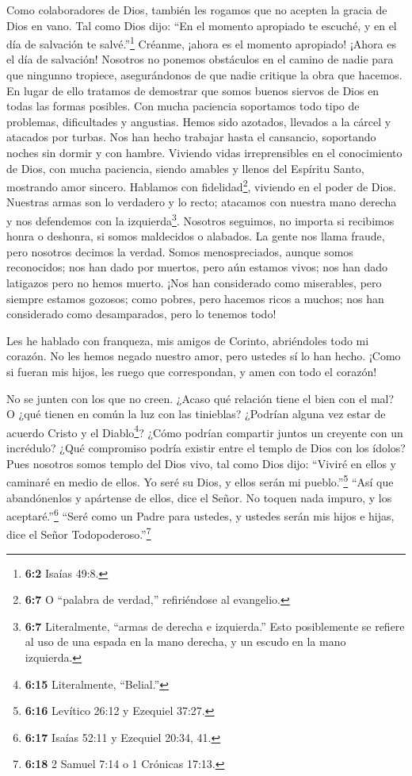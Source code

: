  Como colaboradores de Dios, también les rogamos que no
acepten la gracia de Dios en vano.  Tal como Dios dijo: ``En
el momento apropiado te escuché, y en el día de salvación te
salvé.''\footnote{\textbf{6:2} Isaías 49:8.} Créanme, ¡ahora es el
momento apropiado! ¡Ahora es el día de salvación!  Nosotros
no ponemos obstáculos en el camino de nadie para que ningunno tropiece,
asegurándonos de que nadie critique la obra que hacemos.  En
lugar de ello tratamos de demostrar que somos buenos siervos de Dios en
todas las formas posibles. Con mucha paciencia soportamos todo tipo de
problemas, dificultades y angustias.  Hemos sido azotados,
llevados a la cárcel y atacados por turbas. Nos han hecho trabajar hasta
el cansancio, soportando noches sin dormir y con hambre. 
Viviendo vidas irreprensibles en el conocimiento de Dios, con mucha
paciencia, siendo amables y llenos del Espíritu Santo, mostrando amor
sincero.  Hablamos con fidelidad\footnote{\textbf{6:7} O
  ``palabra de verdad,'' refiriéndose al evangelio.}, viviendo en el
poder de Dios. Nuestras armas son lo verdadero y lo recto; atacamos con
nuestra mano derecha y nos defendemos con la izquierda\footnote{\textbf{6:7}
  Literalmente, ``armas de derecha e izquierda.'' Esto posiblemente se
  refiere al uso de una espada en la mano derecha, y un escudo en la
  mano izquierda.}.  Nosotros seguimos, no importa si
recibimos honra o deshonra, si somos maldecidos o alabados. La gente nos
llama fraude, pero nosotros decimos la verdad.  Somos
menospreciados, aunque somos reconocidos; nos han dado por muertos, pero
aún estamos vivos; nos han dado latigazos pero no hemos muerto.
 ¡Nos han considerado como miserables, pero siempre estamos
gozosos; como pobres, pero hacemos ricos a muchos; nos han considerado
como desamparados, pero lo tenemos todo!

 Les he hablado con franqueza, mis amigos de Corinto,
abriéndoles todo mi corazón.  No les hemos negado nuestro
amor, pero ustedes sí lo han hecho.  ¡Como si fueran mis
hijos, les ruego que correspondan, y amen con todo el corazón!

 No se junten con los que no creen. ¿Acaso qué relación
tiene el bien con el mal? O ¿qué tienen en común la luz con las
tinieblas?  ¿Podrían alguna vez estar de acuerdo Cristo y
el Diablo\footnote{\textbf{6:15} Literalmente, ``Belial.''}? ¿Cómo
podrían compartir juntos un creyente con un incrédulo? 
¿Qué compromiso podría existir entre el templo de Dios con los ídolos?
Pues nosotros somos templo del Dios vivo, tal como Dios dijo: ``Viviré
en ellos y caminaré en medio de ellos. Yo seré su Dios, y ellos serán mi
pueblo.''\footnote{\textbf{6:16} Levítico 26:12 y Ezequiel 37:27.}
 ``Así que abandónenlos y apártense de ellos, dice el
Señor. No toquen nada impuro, y los aceptaré.''\footnote{\textbf{6:17}
  Isaías 52:11 y Ezequiel 20:34, 41.}  ``Seré como un Padre
para ustedes, y ustedes serán mis hijos e hijas, dice el Señor
Todopoderoso.''\footnote{\textbf{6:18} 2 Samuel 7:14 o 1 Crónicas 17:13.}

